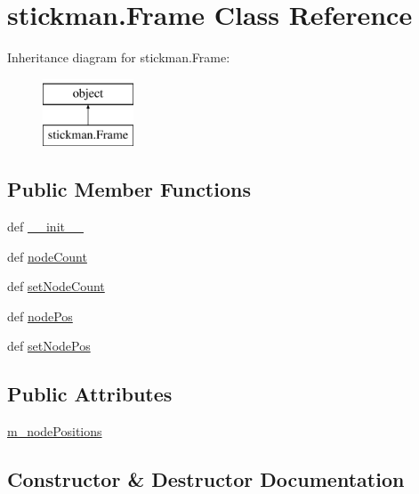 \hypertarget{classstickman_1_1Frame}{}\section{stickman.\+Frame Class Reference}
\label{classstickman_1_1Frame}
Inheritance diagram for stickman.\+Frame\+:\begin{figure}[H]
\begin{center}
\leavevmode
\includegraphics[height=2.000000cm]{classstickman_1_1Frame}
\end{center}
\end{figure}
\subsection*{Public Member Functions}
\begin{DoxyCompactItemize}
\item 
def \hyperlink{classstickman_1_1Frame_a8acfb8cba583c99910beb8cd3c79f162}{\+\_\+\+\_\+init\+\_\+\+\_\+}
\item 
def \hyperlink{classstickman_1_1Frame_a8a16cc67b03b5e0b0c3d71f877dc950a}{node\+Count}
\item 
def \hyperlink{classstickman_1_1Frame_aaf42d93a6de166a366decd3f0e9322e9}{set\+Node\+Count}
\item 
def \hyperlink{classstickman_1_1Frame_a7ea139cb937f870a441f7913d4356302}{node\+Pos}
\item 
def \hyperlink{classstickman_1_1Frame_a58c30320e5c64ed51441193b49700c07}{set\+Node\+Pos}
\end{DoxyCompactItemize}
\subsection*{Public Attributes}
\begin{DoxyCompactItemize}
\item 
\hyperlink{classstickman_1_1Frame_a6f0f0b9e63c54d63811049488807e819}{m\+\_\+node\+Positions}
\end{DoxyCompactItemize}


\subsection{Constructor \& Destructor Documentation}
\hypertarget{classstickman_1_1Frame_a8acfb8cba583c99910beb8cd3c79f162}{}
